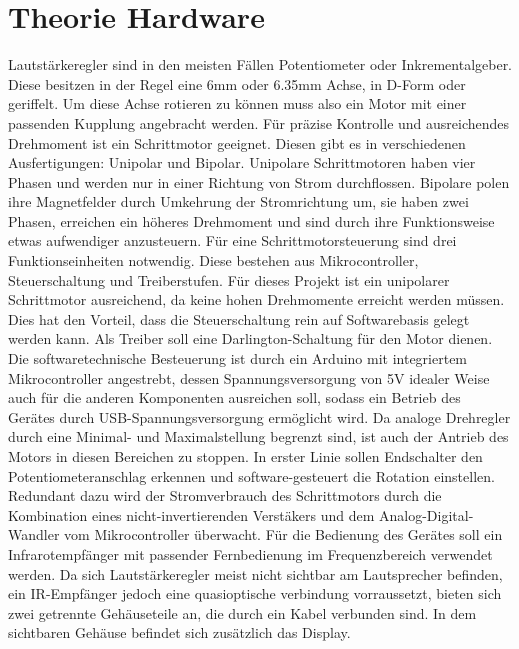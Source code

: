 \documentclass[11pt, titlepage, fleqn]{report}
\begin{document}
		\section{Theorie Hardware}
		\label{sec:Theorie Hardware}
			\sloppy \nohyphens{
			Lautstärkeregler sind in den meisten Fällen Potentiometer oder Inkrementalgeber. %
			Diese besitzen in der Regel eine 6mm oder 6.35mm Achse, in D-Form oder geriffelt.
			Um diese Achse rotieren zu können muss also ein Motor mit einer passenden Kupplung angebracht werden. Für präzise Kontrolle und ausreichendes Drehmoment 
			ist ein Schrittmotor geeignet. Diesen gibt es in verschiedenen Ausfertigungen: Unipolar und Bipolar. 
			Unipolare Schrittmotoren haben vier Phasen und werden nur in einer Richtung von Strom durchflossen. Bipolare polen ihre Magnetfelder durch 
			Umkehrung der Stromrichtung um, sie haben zwei Phasen, erreichen ein höheres Drehmoment und sind durch ihre Funktionsweise etwas aufwendiger anzusteuern. 
			Für eine Schrittmotorsteuerung sind drei Funktionseinheiten notwendig. Diese bestehen aus Mikrocontroller, Steuerschaltung und Treiberstufen.
			Für dieses Projekt ist ein unipolarer Schrittmotor ausreichend, da keine hohen Drehmomente erreicht werden müssen. Dies hat den Vorteil, dass 
			die Steuerschaltung rein auf Softwarebasis gelegt werden kann. Als Treiber soll eine Darlington-Schaltung für den Motor dienen. 
			Die softwaretechnische Besteuerung ist durch ein Arduino mit integriertem Mikrocontroller angestrebt, dessen Spannungsversorgung von 5V 
			idealer Weise auch für die anderen Komponenten ausreichen soll, sodass ein Betrieb des Gerätes durch USB-Spannungsversorgung ermöglicht wird. 
			Da analoge Drehregler durch eine Minimal- und Maximalstellung begrenzt sind, ist auch der Antrieb des Motors in diesen Bereichen zu stoppen. 
			In erster Linie sollen Endschalter den Potentiometeranschlag erkennen und software-gesteuert die Rotation einstellen. Redundant dazu wird der Stromverbrauch 
			des Schrittmotors durch die Kombination eines nicht-invertierenden Verstäkers und dem Analog-Digital-Wandler vom Mikrocontroller überwacht. 
			Für die Bedienung des Gerätes soll ein Infrarotempfänger mit passender Fernbedienung im Frequenzbereich verwendet werden. Da sich Lautstärkeregler 
			meist nicht sichtbar am Lautsprecher befinden, ein IR-Empfänger jedoch eine quasioptische verbindung vorraussetzt, bieten sich zwei getrennte 
			Gehäuseteile an, die durch ein Kabel verbunden sind. In dem sichtbaren Gehäuse befindet sich zusätzlich das Display.}
		\newpage
\end{document}
